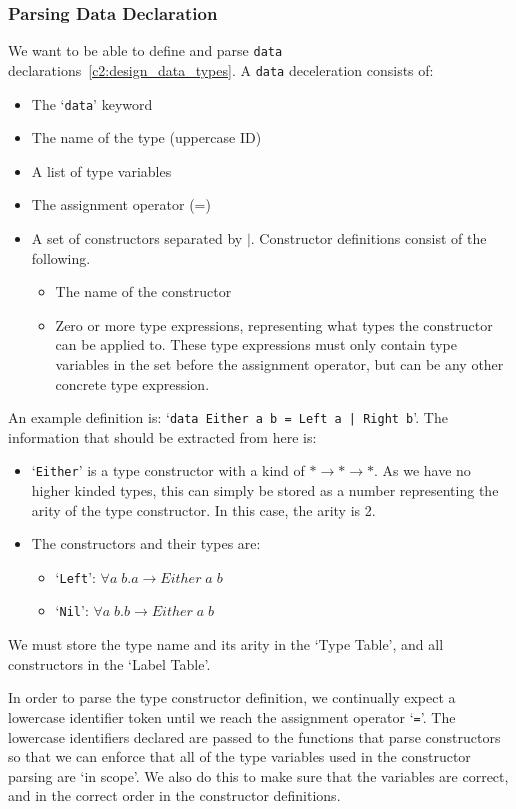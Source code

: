 \subsubsection{Parsing Data Declaration} 
We want to be able to define and parse \verb|data| declarations~\ref{c2:design_data_types}. A \verb|data| deceleration consists of: 
\begin{itemize}
    \item The `\verb|data|' keyword
    \item The name of the type (uppercase ID)
    \item A list of type variables
    \item The assignment operator (=)
    \item A set of constructors separated by \(\mid\). Constructor definitions consist of the following. 
        \begin{itemize}
            \item The name of the constructor
            \item Zero or more type expressions, representing what types the constructor can be applied to. These type expressions must only contain type variables in the set before the assignment operator, but can be any other concrete type expression.  
        \end{itemize}
\end{itemize}

An example definition is: `\verb!data Either a b = Left a | Right b!'. The information that should be extracted from here is:
\begin{itemize}
    \item `\verb|Either|' is a type constructor with a kind of \(*\rightarrow* \rightarrow *\). As we have no higher kinded types, this can simply be stored as a number representing the arity of the type constructor. In this case, the arity is 2.
    \item The constructors and their types are:
    \begin{itemize}
        \item `\verb|Left|': \(\forall a\;b.a\rightarrow Either\;a\;b\)
        \item `\verb|Nil|': \(\forall a\;b.b\rightarrow Either\;a\;b\)
    \end{itemize}
\end{itemize}
We must store the type name and its arity in the `Type Table', and all constructors in the `Label Table'. 

In order to parse the type constructor definition, we continually expect a lowercase identifier token until we reach the assignment operator `\verb|=|'. The lowercase identifiers declared are passed to the functions that parse constructors so that we can enforce that all of the type variables used in the constructor parsing are `in scope'. We also do this to make sure that the variables are correct, and in the correct order in the constructor definitions. 

